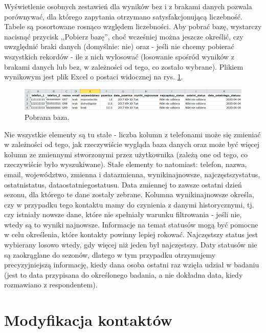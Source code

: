 \documentclass[12pt, twoside, hidelinks]{report}
\begin{document}
Wyświetlenie osobnych zestawień dla wyników bez i z brakami danych pozwala porównywać, dla którego zapytania otrzymano satysfakcjonującą liczebność. Tabele są posortowane rosnąco względem liczebności. Aby pobrać bazę, wystarczy nacisnąć przycisk ,,Pobierz bazę'', choć wcześniej można jeszcze określić, czy uwzględnić braki danych (domyślnie: nie) oraz - jeśli nie chcemy pobierać wszystkich rekordów - ile z nich wylosować (losowanie spośród wyników z brakami danych lub bez, w zależności od tego, co zostało wybrane). Plikiem wynikowym jest plik Excel o postaci widocznej na rys. \ref{wyglad_pobranej_bazy}. \par
\begin{figure}[h!]
\includegraphics[width = 1\textwidth]{1.4.}
\caption{Pobrana baza.}
\label{wyglad_pobranej_bazy}
\end{figure}
Nie wszystkie elementy są tu stałe - liczba kolumn z telefonami może się zmieniać w zależności od tego, jak rzeczywiście wygląda baza danych oraz może być więcej kolumn ze zmiennymi stworzonymi przez użytkownika (zależą one od tego, co rzeczywiście było wyszukiwane). Stałe elementy to natomiast: telefon, nazwa, email, województwo, zmienna i data\textunderscore zmienna, wyniki\textunderscore najnowsze,  najczęstszy\textunderscore status, ostatni\textunderscore status, data\textunderscore ostatniego\textunderscore statusu. Data zmiennej to zawsze ostatni dzień sezonu, dla którego te dane zostały zebrane. Kolumna wyniki\textunderscore najnowsze określa, czy w przypadku tego kontaktu mamy do czynienia z danymi historycznymi, tj. czy istniały nowsze dane, które nie spełniały warunku filtrowania - jeśli nie, wtedy są to wyniki najnowsze. Informacje na temat statusów mogą być pomocne w celu określenia, które kontakty powinny lepiej rokować. Najczęstszy status jest wybierany losowo wtedy, gdy więcej niż jeden był najczęstszy. Daty statusów nie są zaokrąglane do sezonów, dlatego w tym przypadku otrzymujemy precyzyjniejszą informację, kiedy dana osoba ostatni raz wzięła udział w badaniu (jest to data przypisana do określonego badania, a nie dokładna data, kiedy rozmawiano z respondentem).
\chapter{Modyfikacja kontaktów}
\thispagestyle{empty}
\pagebreak
\end{document}
